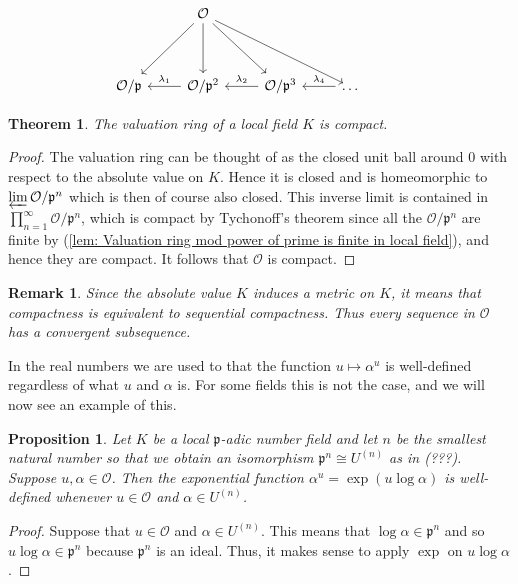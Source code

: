 \documentclass{article}
\newtheorem{theorem}{Theorem}[section]
\newtheorem{proposition}{Proposition}[section]
\newtheorem{remark}{Remark}[section]
\newcommand{\mfrak}[1]{\mathfrak{#1}}
\newcommand{\mcal}[1]{\mathcal{#1}}
\begin{document}
\[\begin{tikzcd}
	& {\mathcal O} \\
	\\
	{\mathcal{O}/\mathfrak{p}} & {\mathcal{O}/\mathfrak{p}^2} & {\mathcal{O}/\mathfrak{p}^3} & \dots & {}
	\arrow["{\lambda_2}"', from=3-3, to=3-2]
	\arrow["{\lambda_1}"', from=3-2, to=3-1]
	\arrow["{\lambda_4}"', from=3-4, to=3-3]
	\arrow[from=1-2, to=3-4]
	\arrow[from=1-2, to=3-3]
	\arrow[from=1-2, to=3-2]
	\arrow[from=1-2, to=3-1]
\end{tikzcd}\]

\begin{theorem} \label{thm: Valuation ring in local field is compact}
    The valuation ring of a local field $K$ is compact.
\end{theorem}
\begin{proof}
    The valuation ring can be thought of as the closed unit ball around 0 with respect to the absolute value on $K$. Hence it is closed and is homeomorphic to $\varprojlim \mcal O / \mfrak p^n$ which is then of course also closed. This inverse limit is contained in $\prod_{n = 1}^\infty \mcal O / \mfrak p^n$, which is compact by Tychonoff's theorem since all the $\mcal O / \mfrak p^n$ are finite by (\ref{lem: Valuation ring mod power of prime is finite in local field}), and hence they are compact. It follows that $\mcal O$ is compact.
\end{proof}
\begin{remark}\label{rem: Compactness is equivalent to sequential compactness}
    Since the absolute value $K$ induces a metric on $K$, it means that compactness is equivalent to sequential compactness. Thus every sequence in $\mcal O$ has a convergent subsequence.
\end{remark}

In the real numbers we are used to that the function $u \mapsto \alpha^u$ is well-defined regardless of what $u$ and $\alpha$ is. For some fields this is not the case, and we will now see an example of this. 

\begin{proposition}
    Let $K$ be a local $\mfrak p$-adic number field and let $n$ be the smallest natural number so that we obtain an isomorphism $\mfrak p^n \cong U^{(n)}$ as in (???). Suppose $u,\alpha \in \mcal O$. Then the exponential function $\alpha^u = \exp(u \log \alpha)$ is well-defined whenever $u \in \mcal O$ and $\alpha \in U^{(n)}$.
\end{proposition}
\begin{proof}
    Suppose that $u \in \mcal O$ and $\alpha \in U^{(n)}$. This means that $\log \alpha \in \mfrak p^n$ and so $u \log \alpha \in \mfrak p^n$ because $\mfrak p^n$ is an ideal. Thus, it makes sense to apply $\exp$ on $u \log \alpha$.
\end{proof}
\end{document}
